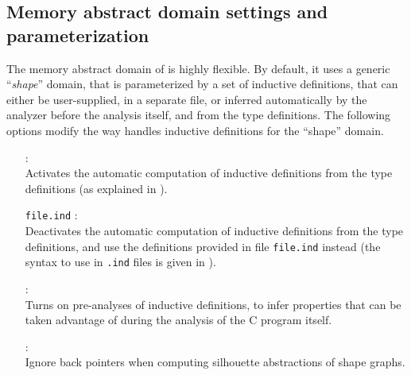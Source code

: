 \subsection{Memory abstract domain settings and parameterization}
\label{s:opt:mem}
The memory abstract domain of \memcad is highly flexible.
By default, it uses a generic ``{\em shape}'' domain, that is
parameterized by a set of inductive definitions, that can either
be user-supplied, in a separate file, or inferred automatically
by the analyzer before the analysis itself, and from the type
definitions.
The following options modify the way \memcad handles inductive
definitions for the ``shape'' domain.
\label{opt:ind}
\begin{itemize}
\item[\doption{-auto-ind}]: \\
  Activates the automatic computation of inductive definitions
  from the type definitions (as explained in ).
\item[\doption{-use-ind} \texttt{file.ind}]: \\
  Deactivates the automatic computation of inductive definitions
  from the type definitions, and use the definitions provided in
  file \texttt{file.ind} instead (the syntax to use in \texttt{.ind}
  files is given in ).
\item[\doption{-ind-analysis}]: \\
  Turns on pre-analyses of inductive definitions, to infer properties
  that can be taken advantage of during the analysis of the C program
  itself.
\item[\doption{-no-prev-fields}] \optdev: \\
  Ignore back pointers when computing silhouette abstractions
  of shape graphs.
\end{itemize}

